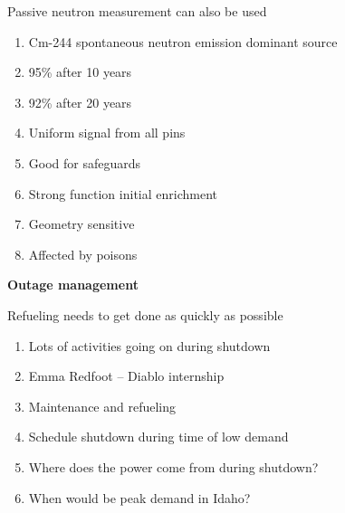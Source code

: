 \documentclass[aspectratio=1610,pdftex,dvipsnames,compress,xcolor={dvipsnames}]{beamer}
\begin{document}
\begin{frame}{Passive neutron measurement can also be used}
    \begin{enumerate}[series=outerlist,topsep=0pt,itemsep=7pt,leftmargin=*,label=(\arabic*)]
        \item[]Cm-244 spontaneous neutron emission dominant source
        \item[]95\% after 10 years
        \item[]92\% after 20 years
        \item[]Uniform signal from all pins
        \item[]Good for safeguards
        \item[]Strong function initial enrichment
        \item[]Geometry sensitive
        \item[]Affected by poisons
    \end{enumerate}
\end{frame}


\begin{frame}[plain]{}
    \centering\LARGE\textbf{Outage management}
\end{frame}


\addtocounter{framenumber}{-1} 
\begin{frame}{Refueling needs to get done as quickly as possible}
    \begin{enumerate}[series=outerlist,topsep=0pt,itemsep=11pt,leftmargin=*,label=(\arabic*)]
        \item[]Lots of activities going on during shutdown
        \item[]Emma Redfoot -- Diablo internship
        \item[]Maintenance and refueling
        \item[]Schedule shutdown during time of low demand
        \item[]Where does the power come from during shutdown?
        \item[]When would be peak demand in Idaho?
    \end{enumerate}
\end{frame}
\end{document}

